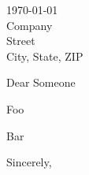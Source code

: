 \documentclass[12pt]{WHOIletter}
\begin{document}
\begin{letter}{
    \today\\
    Company\\
    Street\\
    City, State, ZIP
}

\opening{Dear Someone}

Foo

Bar

  \closing{Sincerely,}


\end{letter}
\end{document}

